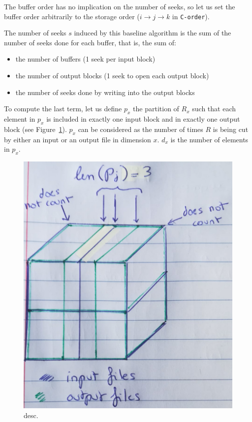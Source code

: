 \documentclass[conference]{IEEEtran}
\begin{document}
The buffer order has no implication on the number of seeks, so let us set the buffer order arbitrarily
to the storage order ($i \rightarrow j \rightarrow k$ in \texttt{C-order}).

The number of seeks $s$ induced by this baseline algorithm is the
sum of the number of seeks done for each buffer, that is, the sum of:
\begin{itemize}
  \item the number of buffers (1 seek per input block)
  \item the number of output blocks (1 seek to open each output block)
  \item the number of seeks done by writing into the output blocks
\end{itemize}
To compute the last term, let us define $p_x$ the partition of $R_x$
such that each element in $p_x$ is included in exactly one input block and in
exactly one output block (see Figure~\ref{fig:p}). $p_x$ can be considered as
the number of times $R$ is being cut by either an input or an output file in
dimension $x$. $d_x$ is the number of elements in $p_x$.
\begin{figure}[h]
  \centering
  \includegraphics[scale=0.15]{./figures/new/p.jpeg}
  \caption{desc.}
  \label{fig:p}
  \end{figure}
\end{document}
